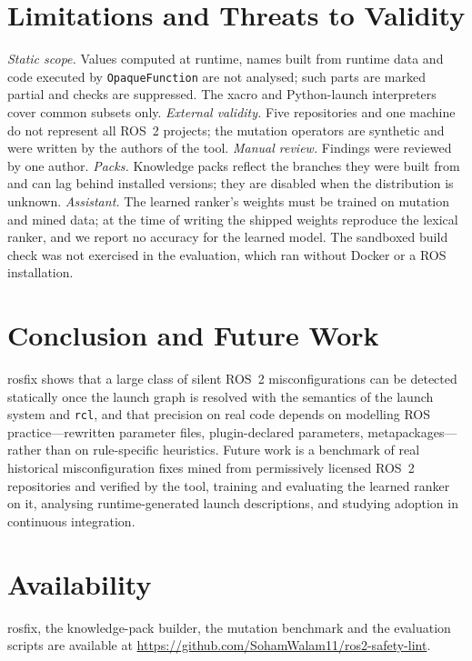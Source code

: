 ﻿\documentclass[conference]{IEEEtran}
\newcommand{\tool}{\textsf{rosfix}}
\newcommand{\code}[1]{\texttt{#1}}
\begin{document}
\section{Limitations and Threats to Validity}

\emph{Static scope.} Values computed at runtime, names built from runtime data and code executed
by \code{OpaqueFunction} are not analysed; such parts are marked partial and checks are
suppressed. The xacro and Python-launch interpreters cover common subsets only.
\emph{External validity.} Five repositories and one machine do not represent all ROS~2
projects; the mutation operators are synthetic and were written by the authors of the tool.
\emph{Manual review.} Findings were reviewed by one author.
\emph{Packs.} Knowledge packs reflect the branches they were built from and can lag behind
installed versions; they are disabled when the distribution is unknown.
\emph{Assistant.} The learned ranker's weights must be trained on mutation and mined data; at
the time of writing the shipped weights reproduce the lexical ranker, and we report no accuracy
for the learned model. The sandboxed build check was not exercised in the evaluation, which ran
without Docker or a ROS installation.

\section{Conclusion and Future Work}

\tool{} shows that a large class of silent ROS~2 misconfigurations can be detected statically
once the launch graph is resolved with the semantics of the launch system and \code{rcl}, and
that precision on real code depends on modelling ROS practice---rewritten parameter files,
plugin-declared parameters, metapackages---rather than on rule-specific heuristics. Future work
is a benchmark of real historical misconfiguration fixes mined from permissively licensed ROS~2
repositories and verified by the tool, training and evaluating the learned ranker on it,
analysing runtime-generated launch descriptions, and studying adoption in continuous
integration.

\section*{Availability}
\tool, the knowledge-pack builder, the mutation benchmark and the evaluation scripts are
available at \url{https://github.com/SohamWalam11/ros2-safety-lint}.



\end{document}
